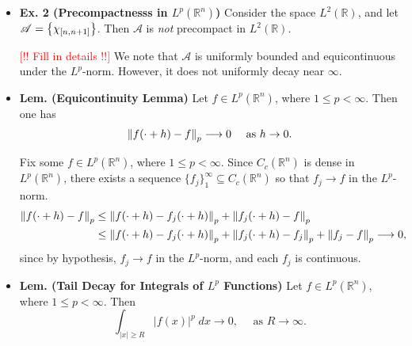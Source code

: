 \documentclass{article}
\begin{document}
\begin{itemize}
	\begin{solutions}
		\textcolor{red}{[!! Fill in details !!]} The sequence $\{f_{n}\}$ does \textit{not} have a convergent subsequence in $L^{2}$. However, it is uniformly bounded and uniformly decays near $\infty$. 
	\end{solutions}
	
	\item \textbf{Ex. 2 (Precompactnesss in $L^{p}(\mathbb{R}^{n})$)} Consider the space $L^{2}(\mathbb{R})$, and let $\mathscr{A} = \brac*{\chi_{[n,n+1]}}$. Then $\mathscr{A}$ is \textit{not} precompact in $L^{2}(\mathbb{R})$. 
	
	\begin{solutions}
		\textcolor{red}{[!! Fill in details !!]} We note that $\mathscr{A}$ is uniformly bounded and equicontinuous under the $L^{p}$-norm. However, it does not uniformly decay near $\infty$. 
	\end{solutions}
	
	\item \textbf{Lem. (Equicontinuity Lemma)} Let $f \in L^{p}(\mathbb{R}^{n})$, where $1 \leq p < \infty$. Then one has 
		\begin{equation}
			\norm{f(\cdot + h) - f}_{p}\longrightarrow 0 \quad \text{ as $h \to 0$}.
		\end{equation}
		
	\begin{solutions}
		Fix some $f \in L^{p}(\mathbb{R}^{n})$, where $1 \leq p < \infty$. Since $C_{c}(\mathbb{R}^{n})$ is dense in $L^{p}(\mathbb{R}^{n})$, there exists a sequence $\{f_{j}\}_{1}^{\infty} \subseteq C_{c}(\mathbb{R}^{n})$ so that $f_{j} \to f$ in the $L^{p}$-norm. 
			\begin{align}
				\begin{split} 
					\norm{f(\cdot + h) - f}_{p} &\leq \norm{f(\cdot + h) - f_{j}(\cdot + h)}_{p} + \norm{f_{j}(\cdot + h) - f}_{p}	\\
					&\leq \norm{f(\cdot + h) - f_{j}(\cdot + h)}_{p} + \norm{f_{j}(\cdot + h) - f_{j}}_{p} + \norm{f_{j} - f}_{p} \longrightarrow 0, 
				\end{split} 
			\end{align}
		since by hypothesis, $f_{j} \to f$ in the $L^{p}$-norm, and each $f_{j}$ is continuous. 
	\end{solutions}
	
	\item \textbf{Lem. (Tail Decay for Integrals of $L^{p}$ Functions)} Let $f \in L^{p}(\mathbb{R}^{n})$, where $1 \leq p < \infty$. Then 
		\begin{equation}
			\int_{|x|\geq R} |f(x)|^{p}\;dx \longrightarrow 0, \quad \text{ as $R \to \infty$}.
		\end{equation}
	

\end{itemize}
\end{document}

